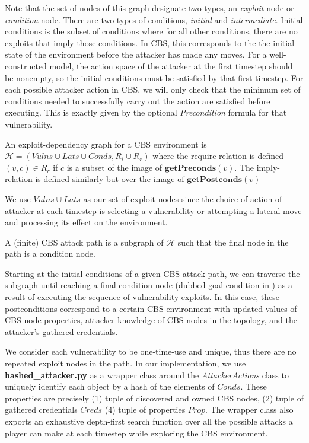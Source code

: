 Note that the set of nodes of this graph designate two types, an \textit{exploit} node or \textit{condition} node. There are two types of conditions, \textit{initial} and \textit{intermediate}. Initial conditions is the subset of conditions where for all other conditions, there are no exploits that imply those conditions. In CBS, this corresponds to the the initial state of the environment before the attacker has made any moves. For a well-constructed model, the action space of the attacker at the first timestep should be nonempty, so the initial conditions must be satisfied by that first timestep. For each possible attacker action in CBS, we will only check that the minimum set of conditions needed to successfully carry out the action are satisfied before executing. This is exactly given by the optional \textit{Precondition} formula for that vulnerability.

\begin{construction}
    An exploit-dependency graph for a CBS environment is $\mathcal{H}=(Vulns \cup Lats \cup Conds, R_{i} \cup R_{r})$ where the require-relation is defined $(v, c) \in R_{r}$ if $c$ is a subset of the image of $\mathbf{getPreconds}(v)$. The imply-relation is defined similarly but over the image of $\mathbf{getPostconds}(v)$
\end{construction}
We use $Vulns \cup Lats$ as our set of exploit nodes since the choice of action of attacker at each timestep is selecting a vulnerability or attempting a lateral move and processing its effect on the environment.

\begin{definition}
    A (finite) CBS attack path is a subgraph of $\mathcal{H}$ such that the final node in the path is a condition node.
\end{definition}

Starting at the initial conditions of a given CBS attack path, we can traverse the subgraph until reaching a final condition node (dubbed goal condition in \cite{zenitani2023attack}) as a result of executing the sequence of vulnerability exploits. In this case, these postconditions correspond to a certain CBS environment with updated values of CBS node properties, attacker-knowledge of CBS nodes in the topology, and the attacker's gathered credentials.

We consider each vulnerability to be one-time-use and unique, thus there are no repeated exploit nodes in the path. In our implementation, we use \textbf{hashed\_attacker.py} as a wrapper class around the \textit{AttackerActions} class to uniquely identify each object by a hash of the elements of $Conds$. These properties are precisely (1) tuple of discovered and owned CBS nodes, (2) tuple of gathered credentials $Creds$ (4) tuple of properties $Prop$. The wrapper class also exports an exhaustive depth-first search function over all the possible attacks a player can make at each timestep while exploring the CBS environment.

